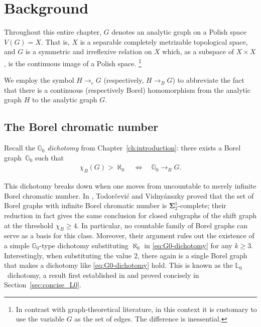
\section{Background}\label{sec:descr_combi_background}

Throughout this entire chapter, $G$ denotes an analytic graph on a Polish space $V(G)=X$.
That is, $X$ is a separable completely metrizable topological space, and $G$ is a symmetric and irreflexive relation on $X$ which, as a subspace of $X\times X$, is the continuous image of a Polish space.%
\footnote{In contrast with graph-theoretical literature, in this context it is customary to use the variable $G$ as the set of edges. The difference is inessential.}

We employ the symbol $H\to_cG$ (respectively, $H\to_BG$) to abbreviate the fact that there is a continuous (respectively Borel) homomorphism from the analytic graph $H$ to the analytic graph $G$.

\subsection{The Borel chromatic number}\label{subsec:borel-chromatic-numbers}

Recall the \emph{$\mathbb{G}_0$ dichotomy} from Chapter~\ref{ch:introduction}: there exists a Borel graph~$\mathbb{G}_0$ such that
\begin{align}\label{eq:G0-dichotomy}
    \chi_B(G) > \aleph_0\quad
    \Longleftrightarrow\quad
    \mathbb{G}_0 \to_B G.
\end{align}

This dichotomy breaks down when one moves from uncountable to merely infinite Borel chromatic number.
In \cite{Todorcevic_2021_ComplexProbBorel}, Todor{\v{c}}evi{\'c} and Vidny{\'{a}}nszky proved that the set of Borel graphs with infinite Borel chromatic number is $\mathbf\Sigma^1_2$-complete; their reduction in fact gives the same conclusion for closed subgraphs of the shift graph at the threshold $\chi_B\geq 4$.
In particular, no countable family of Borel graphs can serve as a basis for this class.
Moreover, their argument rules out the existence of a simple $\mathbb{G}_0$-type dichotomy substituting $\aleph_0$ in \eqref{eq:G0-dichotomy} for any $k\geq3$.
Interestingly, when substituting the value $2$, there again is a single Borel graph that makes a dichotomy like \eqref{eq:G0-dichotomy} hold.
This is known as the $\mathbb{L}_0$~dichotomy, a result first established in \cite{L0paper} and proved concisely in Section~\ref{sec:concise_L0}.

